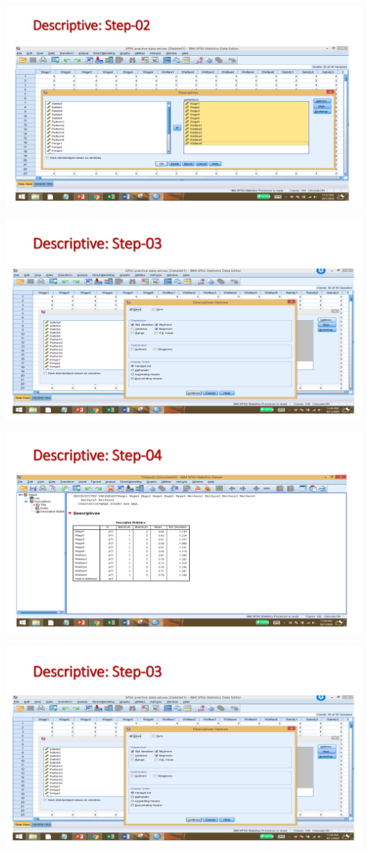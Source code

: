 \documentclass[
  letterpaper,
  DIV=11,
  numbers=noendperiod]{scrreprt}
\begin{document}
\includegraphics{images/slides/img_Page_033.png}

\includegraphics{images/slides/img_Page_034.png}

\includegraphics{images/slides/img_Page_035.png}

\includegraphics{images/slides/img_Page_036.png}
\end{document}
